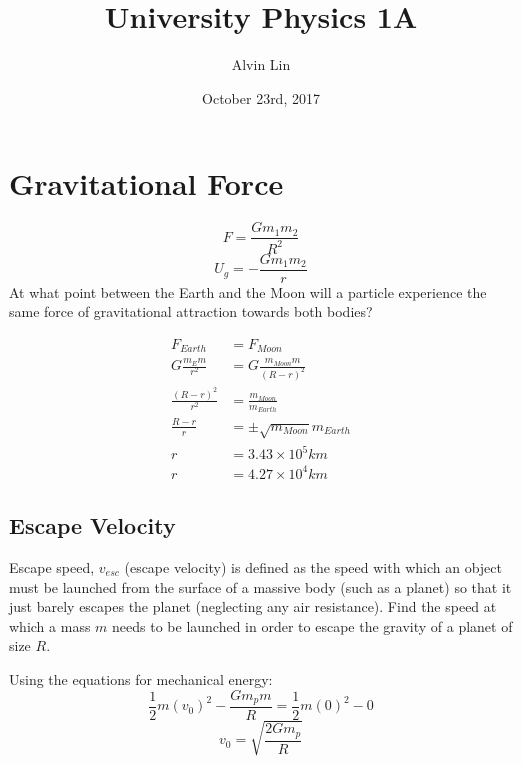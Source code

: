 \documentclass{math}
\title{University Physics 1A}
\author{Alvin Lin}
\date{October 23rd, 2017}
\begin{document}
\maketitle

\section*{Gravitational Force}
\[ F = \frac{Gm_1m_2}{R^2} \]
\[ U_g = -\frac{Gm_1m_2}{r} \]
At what point between the Earth and the Moon will a particle experience the
same force of gravitational attraction towards both bodies?
\begin{center}
\end{center}
\begin{align*}
  F_{Earth} &= F_{Moon} \\
  G\frac{m_Em}{r^2} &= G\frac{m_{Moon}m}{(R-r)^2} \\
  \frac{(R-r)^2}{r^2} &= \frac{m_{Moon}}{m_{Earth}} \\
  \frac{R-r}{r} &= \pm\sqrt{m_{Moon}}{m_{Earth}} \\
  r &= 3.43\times10^5 km \\
  r &= 4.27\times10^4 km
\end{align*}

\subsection*{Escape Velocity}
Escape speed, \( v_{esc} \) (escape velocity) is defined as the speed with which
an object must be launched from the surface of a massive body (such as a planet)
so that it just barely escapes the planet (neglecting any air resistance). Find
the speed at which a mass \( m \) needs to be launched in order to escape the
gravity of a planet of size \( R \).
\begin{center}
\end{center}
Using the equations for mechanical energy:
\[ \frac{1}{2}m(v_0)^2-\frac{Gm_pm}{R} = \frac{1}{2}m(0)^2-0 \]
\[ v_0 = \sqrt{\frac{2Gm_p}{R}} \]
\end{document}
